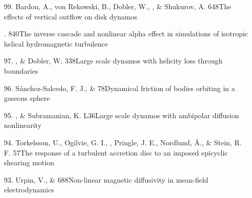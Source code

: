 \begin{itemize}
\item[99.]
Bardou, A., von Rekowski, B., Dobler, W., \Brandenburg, \&
Shukurov, A.
{648}{The effects of vertical outflow on disk dynamos}

\item[\important \relevant 98.]
\Brandenburg{}
{840}{The inverse cascade and nonlinear alpha effect in simulations
of isotropic helical hydromagnetic turbulence}

\item[97.]
\Brandenburg, \& Dobler, W.
{338}{Large scale dynamos with helicity loss through boundaries}

\item[96.]
S\'{a}nchez-Salcedo, F. J., \& \Brandenburg{}
{78}{Dynamical friction of bodies orbiting in a gaseous sphere}

\item[95.]
\Brandenburg, \& Subramanian, K.
{L36}{Large scale dynamos with ambipolar diffusion nonlinearity}

\item[94.]
Torkelsson, U., Ogilvie, G. I., \Brandenburg, Pringle, J. E.,
Nordlund, \AA., \& Stein, R. F.
{57}{The response of a turbulent accretion disc to an imposed epicyclic
shearing motion}

\item[93.]
Urpin, V., \& \Brandenburg{}
{688}{Non-linear magnetic diffusivity in mean-field electrodynamics}


\end{itemize}
